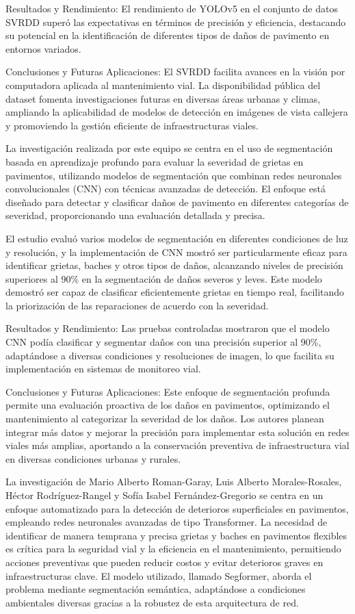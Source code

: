 Resultados y Rendimiento: El rendimiento de YOLOv5 en el conjunto de datos SVRDD superó las expectativas en términos de precisión y eficiencia, destacando su potencial en la identificación de diferentes tipos de daños de pavimento en entornos variados.

Conclusiones y Futuras Aplicaciones: El SVRDD facilita avances en la visión por computadora aplicada al mantenimiento vial. La disponibilidad pública del dataset fomenta investigaciones futuras en diversas áreas urbanas y climas, ampliando la aplicabilidad de modelos de detección en imágenes de vista callejera y promoviendo la gestión eficiente de infraestructuras viales.

\cite{crackseverity2023dl} La investigación realizada por este equipo se centra en el uso de segmentación basada en aprendizaje profundo para evaluar la severidad de grietas en pavimentos, utilizando modelos de segmentación que combinan redes neuronales convolucionales (CNN) con técnicas avanzadas de detección. El enfoque está diseñado para detectar y clasificar daños de pavimento en diferentes categorías de severidad, proporcionando una evaluación detallada y precisa.

El estudio evaluó varios modelos de segmentación en diferentes condiciones de luz y resolución, y la implementación de CNN mostró ser particularmente eficaz para identificar grietas, baches y otros tipos de daños, alcanzando niveles de precisión superiores al 90\% en la segmentación de daños severos y leves. Este modelo demostró ser capaz de clasificar eficientemente grietas en tiempo real, facilitando la priorización de las reparaciones de acuerdo con la severidad.

Resultados y Rendimiento: Las pruebas controladas mostraron que el modelo CNN podía clasificar y segmentar daños con una precisión superior al 90\%, adaptándose a diversas condiciones y resoluciones de imagen, lo que facilita su implementación en sistemas de monitoreo vial.

Conclusiones y Futuras Aplicaciones: Este enfoque de segmentación profunda permite una evaluación proactiva de los daños en pavimentos, optimizando el mantenimiento al categorizar la severidad de los daños. Los autores planean integrar más datos y mejorar la precisión para implementar esta solución en redes viales más amplias, aportando a la conservación preventiva de infraestructura vial en diversas condiciones urbanas y rurales.


\cite{romangaray2023segformer} La investigación de Mario Alberto Roman-Garay, Luis Alberto Morales-Rosales, Héctor Rodríguez-Rangel y Sofía Isabel Fernández-Gregorio se centra en un enfoque automatizado para la detección de deterioros superficiales en pavimentos, empleando redes neuronales avanzadas de tipo Transformer. La necesidad de identificar de manera temprana y precisa grietas y baches en pavimentos flexibles es crítica para la seguridad vial y la eficiencia en el mantenimiento, permitiendo acciones preventivas que pueden reducir costos y evitar deterioros graves en infraestructuras clave. El modelo utilizado, llamado Segformer, aborda el problema mediante segmentación semántica, adaptándose a condiciones ambientales diversas gracias a la robustez de esta arquitectura de red.


